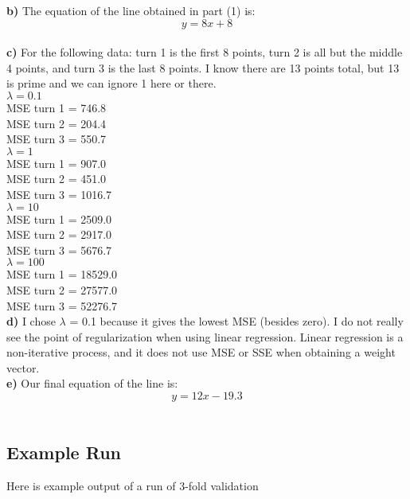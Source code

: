 \documentclass{article}
\begin{document}
\textbf{b)} The equation of the line obtained in part (1) is: $$y = 8 x  + 8$$ \\

\textbf{c)} For the following data: turn 1 is the first 8 points, turn 2 is all but the middle 4 points, and turn 3 is the last 8 points. 
I know there are 13 points total, but 13 is prime and we can ignore 1 here or there. \\

 $\lambda = 0.1$ \\
 MSE turn  1  =  746.8 \\
MSE turn  2  =  204.4 \\
MSE turn  3  =  550.7 \\

 $\lambda = 1$ \\
MSE turn  1  =  907.0 \\
MSE turn  2  =  451.0 \\
MSE turn  3  =  1016.7 \\

 $\lambda = 10$ \\
MSE turn  1  =  2509.0 \\
MSE turn  2  =  2917.0 \\
MSE turn  3  =  5676.7 \\

 $\lambda =100$ \\
MSE turn  1  =  18529.0 \\
MSE turn  2  =  27577.0 \\
MSE turn  3  =  52276.7 \\

\textbf{d)} I chose $\lambda$ = 0.1 because it gives the lowest MSE (besides zero). I do not really see the point of regularization 
when using linear regression. Linear regression is a non-iterative process, and it does not use MSE or SSE when obtaining a weight vector. \\

\textbf{e)} Our final equation of the line is: $$y = 12 x  - 19.3$$ \\


\subsection*{Example Run}
Here is example output of a run of 3-fold validation
\end{document}
